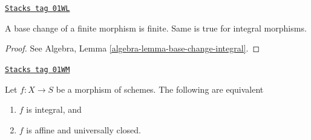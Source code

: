 \begin{lemma}
\label{morphisms-lemma-base-change-finite}
\href{https://stacks.math.columbia.edu/tag/01WL}{\texttt{Stacks tag 01WL}}

A base change of a finite morphism is finite.
Same is true for integral morphisms.
\end{lemma}

\begin{proof}
See Algebra, Lemma \ref{algebra-lemma-base-change-integral}.
\end{proof}

\begin{lemma}[integral $=$ affine $+$ universally closed]
\label{morphisms-lemma-integral-universally-closed}
\href{https://stacks.math.columbia.edu/tag/01WM}{\texttt{Stacks tag 01WM}}


Let $f : X \to S$ be a morphism of schemes.
The following are equivalent
\begin{enumerate}
\item $f$ is integral, and
\item $f$ is affine and universally closed.
\end{enumerate}
\end{lemma}

